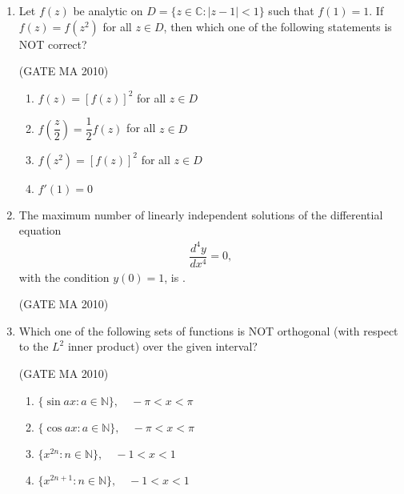 \documentclass[journal,12pt,onecolumn]{IEEEtran}
\theoremstyle{remark}
\begin{document}
\begin{flushleft}
\begin{enumerate}
\item Let $f(z)$ be analytic on $D=\{z\in \mathbb{C}:|z-1|<1\}$ such that $f(1)=1$. If $f(z)=f(z^{2})$ for all $z\in D$, then which one of the following statements is NOT correct? \underline{\hspace{2cm}}

\hfill (GATE MA 2010)

\begin{enumerate}
\item $f(z)=[f(z)]^{2}$ for all $z \in D$
\item $f\left(\dfrac{z}{2}\right)=\dfrac{1}{2}f(z)$ for all $z \in D$
\item $f(z^{2})=[f(z)]^{2}$ for all $z \in D$
\item $f'(1)=0$
\end{enumerate}

\item The maximum number of linearly independent solutions of the differential equation
\begin{align*}
\dfrac{d^{4}y}{dx^{4}}=0,
\end{align*}
with the condition $y(0)=1$, is \underline{\hspace{2cm}}.

\hfill (GATE MA 2010)

\begin{enumerate}
\end{enumerate}

\item Which one of the following sets of functions is NOT orthogonal (with respect to the $L^{2}$ inner product) over the given interval? \underline{\hspace{2cm}}

\hfill (GATE MA 2010)

\begin{enumerate}
\item $\{\sin ax: a \in \mathbb{N}\}, \quad -\pi < x < \pi$
\item $\{\cos ax: a \in \mathbb{N}\}, \quad -\pi < x < \pi$
\item $\{x^{2n}: n \in \mathbb{N}\}, \quad -1 < x < 1$
\item $\{x^{2n+1}: n \in \mathbb{N}\}, \quad -1 < x < 1$
\end{enumerate}


\end{enumerate}
\end{flushleft}
\end{document}

